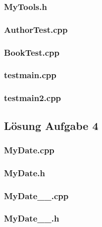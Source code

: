 \subsubsection{MyTools.h}

\subsubsection{AuthorTest.cpp}

\subsubsection{BookTest.cpp}

\subsubsection{testmain.cpp}

\subsubsection{testmain2.cpp}


\subsection{Lösung Aufgabe 4}
\setcounter{subsection}{1}
\subsubsection{MyDate.cpp}

\subsubsection{MyDate.h}

\subsubsection{MyDate\_\_.cpp}

\subsubsection{MyDate\_\_.h}

